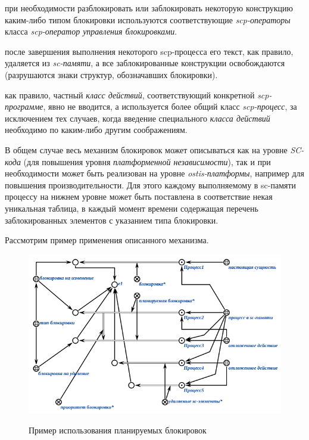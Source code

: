 \begin{textitemize}
\item при необходимости разблокировать или заблокировать некоторую конструкцию каким-либо типом блокировки используются соответствующие \textit{scp-операторы} класса \textit{scp-оператор управления блокировками}.
\item после завершения выполнения некоторого scp-процесса его текст, как правило, удаляется из \textit{sc-памяти}, а все заблокированные конструкции освобождаются (разрушаются знаки структур, обозначавших блокировки).
\item как правило, частный \textit{класс действий}, соответствующий конкретной \textit{scp-программе}, явно не вводится, а используется более общий класс \textit{scp-процесс}, за исключением тех случаев, когда введение	специального \textit{класса действий} необходимо по каким-либо другим соображениям.
\end{textitemize}

В общем случае весь механизм блокировок может описываться как на уровне \textit{SC-кода} (для повышения уровня \textit{платформенной независимости}), так и при необходимости может быть реализован на уровне \textit{ostis-платформы}, например для повышения производительности. Для этого каждому выполняемому в sc-памяти процессу на нижнем уровне может быть поставлена в соответствие некая уникальная таблица, в каждый момент времени содержащая перечень заблокированных элементов с указанием типа блокировки.

Рассмотрим пример применения описанного механизма.

\begin{figure}[h]
	\centering
	\caption{Пример использования планируемых блокировок}
	\includegraphics[scale=0.8]{images/part3/chapter_situation_management/plan_lock_1.png}
	\label{fig:plan_lock_1}
\end{figure}

